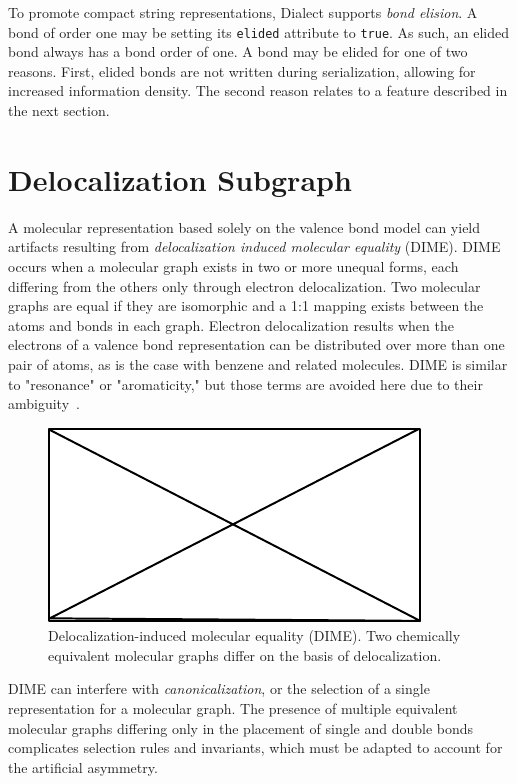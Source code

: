 \documentclass{article}
\def\ttt{\texttt}
\begin{document}
To promote compact string representations, Dialect supports \textit{bond elision}. A bond of order one may be setting its \ttt{elided} attribute to \ttt{true}. As such, an elided bond always has a bond order of one. A bond may be elided for one of two reasons. First, elided bonds are not written during serialization, allowing for increased information density. The second reason relates to a feature described in the next section.

\section*{Delocalization Subgraph}

A molecular representation based solely on the valence bond model can yield artifacts resulting from \textit{delocalization induced molecular equality} (DIME). DIME occurs when a molecular graph exists in two or more unequal forms, each differing from the others only through electron delocalization. Two molecular graphs are equal if they are isomorphic and a 1:1 mapping exists between the atoms and bonds in each graph. Electron delocalization results when the electrons of a valence bond representation can be distributed over more than one pair of atoms, as is the case with benzene and related molecules. DIME is similar to "resonance" or "aromaticity," but those terms are avoided here due to their ambiguity~\cite{randic:2018,kerber:2006}.

\begin{figure}
    \centering
    \includegraphics{filler}
    \caption{Delocalization-induced molecular equality (DIME). Two chemically equivalent molecular graphs differ on the basis of delocalization.}
    \label{fig:dime}
\end{figure}

DIME can interfere with \textit{canonicalization}, or the selection of a single representation for a molecular graph. The presence of multiple equivalent molecular graphs differing only in the placement of single and double bonds complicates selection rules and invariants, which must be adapted to account for the artificial asymmetry.
\end{document}
